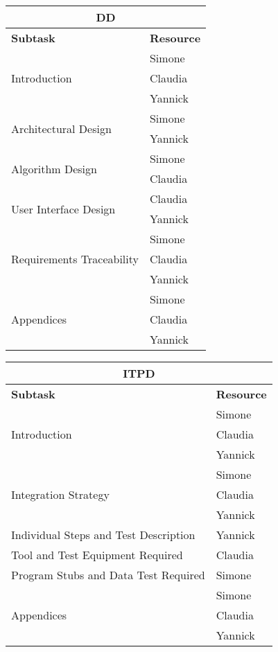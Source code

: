 \vspace* {30px}


\begin{center}
\begin{tabular} {|l|l|}
	\multicolumn{2}{c}{\textbf{DD}} \\ \hline
	\textbf{Subtask} & \textbf{Resource} \\ \hline
	\multirow{3}{*}{Introduction} & Simone \\
								 & Claudia \\
								 & Yannick \\ \hline
	\multirow{2}{*}{Architectural Design} & Simone \\
										  &	Yannick \\ \hline
	\multirow{2}{*}{Algorithm Design} & Simone \\
									& Claudia \\ \hline
	\multirow{2}{*}{User Interface Design} & Claudia \\
				& Yannick \\ \hline
	\multirow{3}{*}{Requirements Traceability} & Simone \\
											   & Claudia \\
											   & Yannick \\ \hline
	\multirow{3}{*}{Appendices} & Simone \\ 
				& Claudia \\
				& Yannick \\ \hline
\end{tabular}
\end{center}

\vspace* {30px}

\begin{center}
\begin{tabular}{ |l|l| }
	\multicolumn{2}{c}{\textbf{ITPD}} \\ \hline
	\textbf{Subtask} & \textbf{Resource} \\ \hline
	\multirow{3}{*}{Introduction} & Simone \\ 
				& Claudia \\
				& Yannick \\ \hline
	\multirow{3}{*}{Integration Strategy} & Simone \\ 
									& Claudia \\
									& Yannick \\ \hline
	\multirow{1}{*}{Individual Steps and Test Description} & Yannick \\ \hline
	\multirow{1}{*}{ Tool and Test Equipment Required } & Claudia \\ \hline
	\multirow{1}{*}{Program Stubs and Data Test Required} & Simone \\ \hline
	\multirow{3}{*}{Appendices} & Simone \\ 
				& Claudia \\
				& Yannick \\ \hline

\end{tabular}
\end{center}

